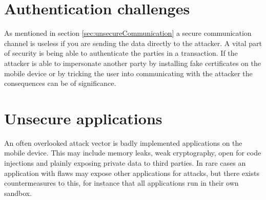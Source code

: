 \section{Authentication challenges}
\label{sec:authenticationChallenges}
As mentioned in section \ref{sec:unsecureCommunication} a secure communication channel is useless if you are sending the data directly to the attacker. A vital part of security is being able to authenticate the parties in a transaction. If the attacker is able to impersonate another party by installing fake certificates on the mobile device or by tricking the user into communicating with the attacker the consequences can be of significance.

\section{Unsecure applications}
An often overlooked attack vector is badly implemented applications on the mobile device. This may include memory leaks, weak cryptography, open for code injections and plainly exposing private data to third parties. In rare cases an application with flaws may expose other applications for attacks, but there exists countermeasures to this, for instance that all applications run in their own sandbox.
